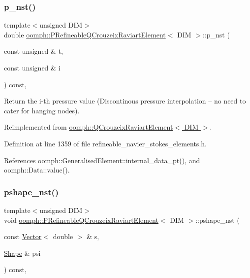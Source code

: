 \subsubsection{\texorpdfstring{p\+\_\+nst()}{p\_nst()}\hspace{0.1cm}{\footnotesize\ttfamily [2/2]}}
{\footnotesize\ttfamily template$<$unsigned D\+IM$>$ \\
double \hyperlink{classoomph_1_1PRefineableQCrouzeixRaviartElement}{oomph\+::\+P\+Refineable\+Q\+Crouzeix\+Raviart\+Element}$<$ D\+IM $>$\+::p\+\_\+nst (\begin{DoxyParamCaption}\item[{const unsigned \&}]{t,  }\item[{const unsigned \&}]{i }\end{DoxyParamCaption}) const\hspace{0.3cm}{\ttfamily [inline]}, {\ttfamily [virtual]}}



Return the i-\/th pressure value (Discontinous pressure interpolation -- no need to cater for hanging nodes). 



Reimplemented from \hyperlink{classoomph_1_1QCrouzeixRaviartElement_ab7e5c4345c95002750592f7dcaa7a1c5}{oomph\+::\+Q\+Crouzeix\+Raviart\+Element$<$ D\+I\+M $>$}.



Definition at line 1359 of file refineable\+\_\+navier\+\_\+stokes\+\_\+elements.\+h.



References oomph\+::\+Generalised\+Element\+::internal\+\_\+data\+\_\+pt(), and oomph\+::\+Data\+::value().

\mbox{\label{classoomph_1_1PRefineableQCrouzeixRaviartElement_a19222e5c997c7ce4a30452d9aab12ad0}} 
\subsubsection{\texorpdfstring{pshape\+\_\+nst()}{pshape\_nst()}\hspace{0.1cm}{\footnotesize\ttfamily [1/6]}}
{\footnotesize\ttfamily template$<$unsigned D\+IM$>$ \\
void \hyperlink{classoomph_1_1PRefineableQCrouzeixRaviartElement}{oomph\+::\+P\+Refineable\+Q\+Crouzeix\+Raviart\+Element}$<$ D\+IM $>$\+::pshape\+\_\+nst (\begin{DoxyParamCaption}\item[{const \hyperlink{classoomph_1_1Vector}{Vector}$<$ double $>$ \&}]{s,  }\item[{\hyperlink{classoomph_1_1Shape}{Shape} \&}]{psi }\end{DoxyParamCaption}) const\hspace{0.3cm}{\ttfamily [inline]}, {\ttfamily [virtual]}}



